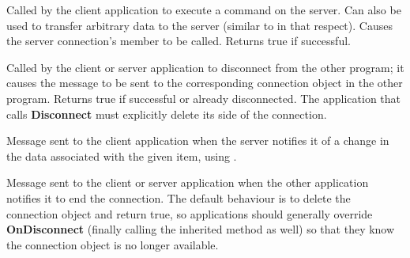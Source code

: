 \label{wxconnectionexecute}





Called by the client application to execute a command on the
server. Can also be used to transfer arbitrary data to the server
(similar to  in
that respect). Causes the server connection's  
member to be called. Returns true if successful.

\label{wxconnectiondisconnect}


Called by the client or server application to disconnect from the
other program; it causes the  
message to be sent to the corresponding connection object in the
other program. Returns true if successful or already disconnected.
The application that calls {\bf Disconnect} must explicitly delete
its side of the connection.

\label{wxconnectiononadvise}


Message sent to the client application when the server notifies
it of a change in the data associated with the given item, using
.

\label{wxconnectionondisconnect}


Message sent to the client or server application when the other
application notifies it to end the connection. The default
behaviour is to delete the connection object and return true, so
applications should generally override {\bf OnDisconnect}
(finally calling the inherited method as well) so that they know
the connection object is no longer available.


